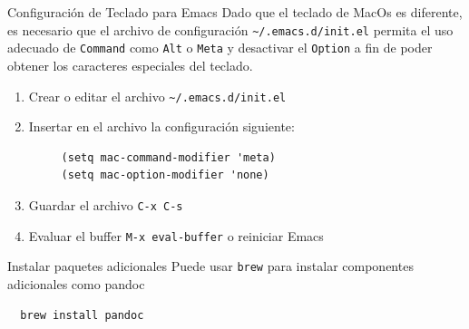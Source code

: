 \documentclass[presentation]{beamer}
\begin{document}
\begin{frame}{Configuración de Teclado para Emacs}
 Dado que el teclado de MacOs es diferente, es necesario que el archivo
de configuración \texttt{\textasciitilde{}/.emacs.d/init.el} permita el uso adecuado de
\texttt{Command} como \texttt{Alt} o \texttt{Meta} y desactivar el \texttt{Option} a fin de poder
obtener los caracteres especiales del teclado.

\begin{enumerate}
\item Crear o editar el archivo \texttt{\textasciitilde{}/.emacs.d/init.el}
\item Insertar en el archivo la configuración siguiente:
\begin{verbatim}
     (setq mac-command-modifier 'meta)
     (setq mac-option-modifier 'none)
\end{verbatim}
\item Guardar el archivo \texttt{C-x C-s}
\item Evaluar el buffer \texttt{M-x eval-buffer} o reiniciar Emacs
\end{enumerate}
\end{frame}
\begin{frame}[label={sec:orgcdfb0ca},fragile]{Instalar paquetes adicionales}
 Puede usar \texttt{brew} para instalar componentes adicionales como pandoc

\begin{verbatim}
  brew install pandoc
\end{verbatim}
\end{frame}
\end{document}
